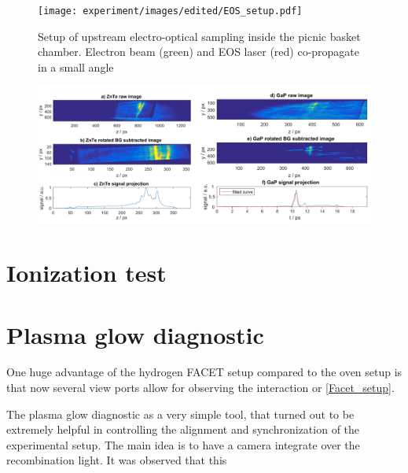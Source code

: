 \begin{figure}[htbp]
\texttt{[image: experiment/images/edited/EOS\_setup.pdf]}
\caption{Setup of upstream electro-optical sampling inside the picnic basket chamber. Electron beam (green) and EOS laser (red) co-propagate in a small angle }
\label{img:EOS_Setup}
\end{figure}
\begin{figure}
\includegraphics[width=1.0\textwidth]{experiment/images/edited/EOS_Signal.pdf}
\label{img:EOS_ZnTe}
\end{figure}


\newpage
\section{Ionization test}

\section{Plasma glow diagnostic}
\label{sec:Plasma_Glow}
One huge advantage of the hydrogen FACET setup compared to the oven setup is that now several view ports allow for observing the interaction or \ref{Facet_setup}.

The plasma glow diagnostic as a very simple tool, that turned out to be extremely helpful in controlling the 
alignment and synchronization of the experimental setup. The main idea is to have a camera integrate over the recombination light. It was observed that this 

